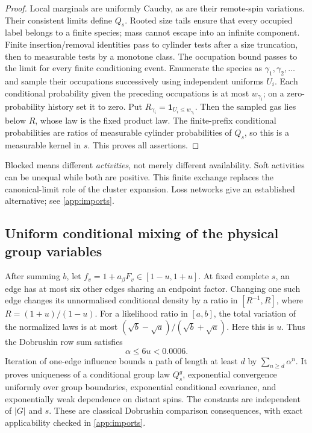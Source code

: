 \documentclass[11pt,reqno]{amsart}
\numberwithin{equation}{section}
\theoremstyle{definition}
\theoremstyle{remark}
\newcommand{\one}{\mathbf1}
\begin{document}
\begin{proof}
Local marginals are uniformly Cauchy, as are their remote-spin variations. Their consistent limits define $Q_s$. Rooted size tails ensure that every occupied label belongs to a finite species; mass cannot escape into an infinite component. Finite insertion/removal identities pass to cylinder tests after a size truncation, then to measurable tests by a monotone class. The occupation bound passes to the limit for every finite conditioning event. Enumerate the species as $\gamma_1,\gamma_2,\ldots$ and sample their occupations successively using independent uniforms $U_i$. Each conditional probability given the preceding occupations is at most $w_{\gamma_i}$; on a zero-probability history set it to zero. Put $R_{\gamma_i}=\one_{U_i\leq w_{\gamma_i}}$. Then the sampled gas lies below $R$, whose law is the fixed product law. The finite-prefix conditional probabilities are ratios of measurable cylinder probabilities of $Q_s$, so this is a measurable kernel in $s$. This proves all assertions.
\end{proof}

Blocked means different \emph{activities}, not merely different availability. Soft activities can be unequal while both are positive. This finite exchange replaces the canonical-limit role of the cluster expansion. Loss networks give an established alternative; see \cref{app:imports}.

\subsection{Uniform conditional mixing of the physical group variables}\label{sec:group}
After summing $b$, let $f_v=1+a_\beta F_v\in[1-u,1+u]$. At fixed complete $s$, an edge has at most six other edges sharing an endpoint factor. Changing one such edge changes its unnormalised conditional density by a ratio in $[R^{-1},R]$, where $R=(1+u)/(1-u)$. For a likelihood ratio in $[a,b]$, the total variation of the normalized laws is at most $(\sqrt b-\sqrt a)/(\sqrt b+\sqrt a)$. Here this is $u$. Thus the Dobrushin row sum satisfies
\begin{equation}\label{eq:alpha}
 \alpha\leq6u<0.0006.
\end{equation}
Iteration of one-edge influence bounds a path of length at least $d$ by $\sum_{n\geq d}\alpha^n$. It proves uniqueness of a conditional group law $Q_s^g$, exponential convergence uniformly over group boundaries, exponential conditional covariance, and exponentially weak dependence on distant spins. The constants are independent of $|G|$ and $s$. These are classical Dobrushin comparison consequences, with exact applicability checked in \cref{app:imports}.
\end{document}
